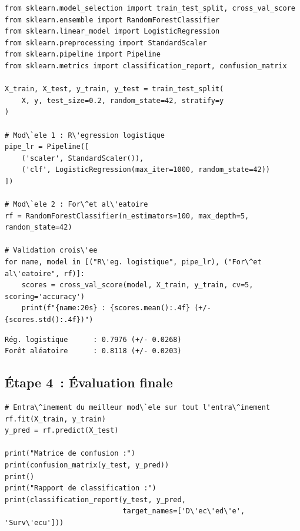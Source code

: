 \begin{codeblock}[title=\textbf{Python}]
\begin{verbatim}
from sklearn.model_selection import train_test_split, cross_val_score
from sklearn.ensemble import RandomForestClassifier
from sklearn.linear_model import LogisticRegression
from sklearn.preprocessing import StandardScaler
from sklearn.pipeline import Pipeline
from sklearn.metrics import classification_report, confusion_matrix

X_train, X_test, y_train, y_test = train_test_split(
    X, y, test_size=0.2, random_state=42, stratify=y
)

# Mod\`ele 1 : R\'egression logistique
pipe_lr = Pipeline([
    ('scaler', StandardScaler()),
    ('clf', LogisticRegression(max_iter=1000, random_state=42))
])

# Mod\`ele 2 : For\^et al\'eatoire
rf = RandomForestClassifier(n_estimators=100, max_depth=5, random_state=42)

# Validation crois\'ee
for name, model in [("R\'eg. logistique", pipe_lr), ("For\^et al\'eatoire", rf)]:
    scores = cross_val_score(model, X_train, y_train, cv=5, scoring='accuracy')
    print(f"{name:20s} : {scores.mean():.4f} (+/- {scores.std():.4f})")
\end{verbatim}
\end{codeblock}

\begin{codeoutput}
\begin{verbatim}
Rég. logistique      : 0.7976 (+/- 0.0268)
Forêt aléatoire      : 0.8118 (+/- 0.0203)
\end{verbatim}
\end{codeoutput}

\subsection{\'Etape 4~: \'Evaluation finale}

\begin{codeblock}[title=\textbf{Python}]
\begin{verbatim}
# Entra\^inement du meilleur mod\`ele sur tout l'entra\^inement
rf.fit(X_train, y_train)
y_pred = rf.predict(X_test)

print("Matrice de confusion :")
print(confusion_matrix(y_test, y_pred))
print()
print("Rapport de classification :")
print(classification_report(y_test, y_pred,
                            target_names=['D\'ec\'ed\'e', 'Surv\'ecu']))
\end{verbatim}
\end{codeblock}

